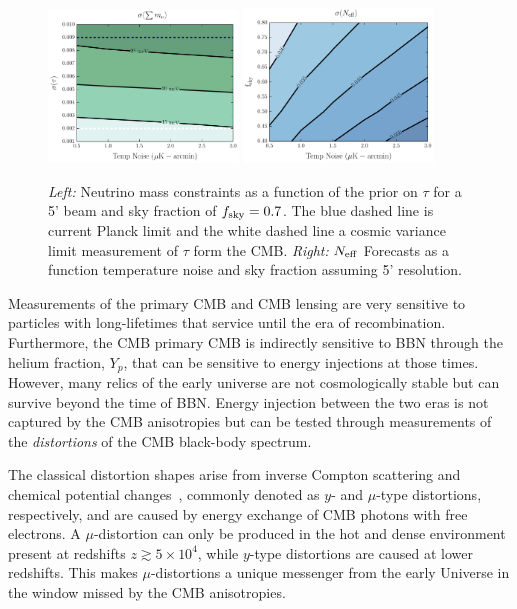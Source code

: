 \begin{figure}[t!]
\begin{center}
\includegraphics[width=0.45\textwidth]{figs/Mnu_tauprior.pdf}
\includegraphics[width=0.45\textwidth]{figs/Neff.pdf}
\caption{ {\it Left:} Neutrino mass constraints as a function of the prior on $\tau$ for a 5' beam and sky fraction of $f_{\rm sky} = 0.7$.  The blue dashed line is current Planck limit and the white dashed line a cosmic variance limit measurement of $\tau$ form the CMB. {\it Right:} ${N_{\rm eff}}$ Forecasts as a function temperature noise and sky fraction assuming 5' resolution.}
\label{fig:Neff_future}
\end{center}
\end{figure}

Measurements of the primary CMB and CMB lensing are very sensitive to particles with long-lifetimes that service until the era of recombination.  Furthermore, the CMB primary CMB is indirectly sensitive to BBN through the helium fraction, $Y_p$, that can be sensitive to energy injections at those times.  However, many relics of the early universe are not cosmologically stable but can survive beyond the time of BBN.  Energy injection between the two eras is not captured by the CMB anisotropies but can be tested through measurements of the {\it distortions} of the CMB black-body spectrum. 

The classical distortion shapes arise from inverse Compton scattering and chemical potential changes~\citep{Zeldovich1969, Sunyaev1970mu}, 
commonly denoted as $y$- and $\mu$-type distortions, respectively, and are caused by energy exchange of CMB photons with free electrons. 
A $\mu$-distortion can only be produced in the hot and dense environment present at redshifts $z\gtrsim 5\times10^4$, while $y$-type 
distortions are caused at lower redshifts. This makes $\mu$-distortions a unique messenger from the early Universe in the window missed by the CMB anisotropies.

